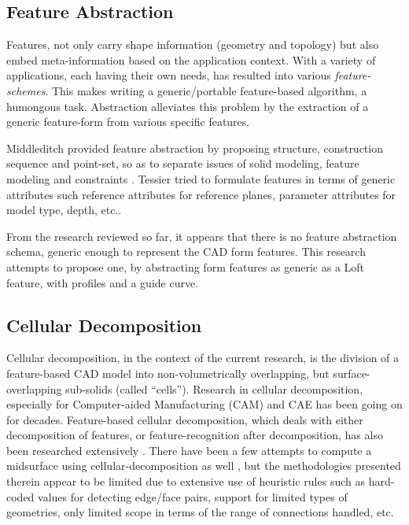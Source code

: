 \subsection{Feature Abstraction}
Features, not only carry shape information (geometry and topology) but also embed meta-information based on the application context. With a variety of applications, each having their own needs,  has resulted into various {\em feature-schemes}.  This makes writing a  generic/portable feature-based algorithm, a humongous task. Abstraction alleviates this problem by the extraction of a generic feature-form from various specific features. 
 
  Middleditch  provided feature abstraction by proposing structure, construction sequence and point-set, so as to separate issues of  solid modeling, feature modeling and constraints \cite{Middleditch1997}.  Tessier tried to formulate features in terms of generic attributes such reference attributes for reference planes, parameter attributes for model type, depth, etc.\cite{Tessier2013}. 
  
From the research reviewed so far, it appears that there is no feature abstraction schema, generic enough to represent the CAD form features. This research attempts to propose one, by  abstracting form features as generic as a Loft feature, with profiles and a guide curve.
  
 \subsection{Cellular Decomposition}
 
Cellular decomposition, in the context of the current research, is the division of a feature-based CAD model into non-volumetrically overlapping, but surface-overlapping sub-solids (called ``cells'').  Research in  cellular decomposition, especially for Computer-aided Manufacturing (CAM) and CAE has been going on for decades. Feature-based cellular decomposition, which deals with either decomposition of features, or feature-recognition after decomposition,  has also been  researched extensively \cite{Bidarra1993,Woo2003, Boussuge2013}. There have been a few attempts to compute a midsurface using cellular-decomposition as well \cite{Chong2004, Woo2013, Boussuge2013, Zhu2015}, but the methodologies presented therein appear to be limited due to extensive use of heuristic rules such as hard-coded values for detecting edge/face pairs, support for limited types of geometries, only limited scope in terms of the range of connections  handled, etc.

